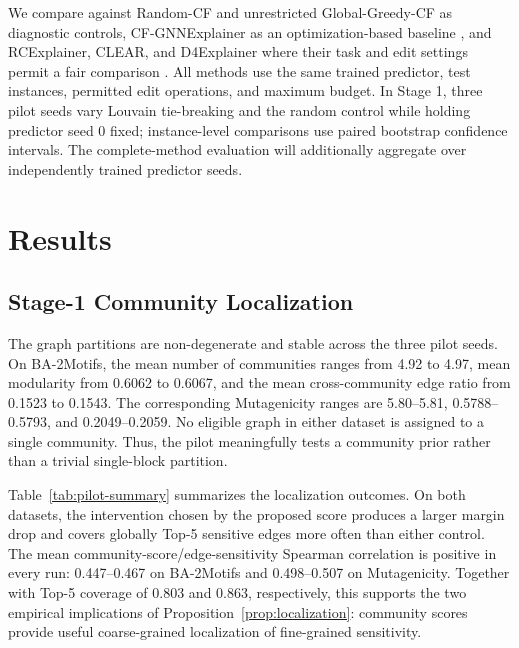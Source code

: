 \documentclass[runningheads]{llncs}
\begin{document}
We compare against Random-CF and unrestricted Global-Greedy-CF as diagnostic
controls, CF-GNNExplainer as an optimization-based baseline
\cite{lucic2022cfgnn}, and RCExplainer, CLEAR, and D4Explainer where their
task and edit settings permit a fair comparison
\cite{bajaj2021rcexplainer,ma2022clear,huang2023d4explainer}.
All methods use the same trained predictor, test instances, permitted edit
operations, and maximum budget. In Stage 1, three pilot seeds vary Louvain
tie-breaking and the random control while holding predictor seed 0 fixed;
instance-level comparisons use paired bootstrap confidence intervals. The
complete-method evaluation will additionally aggregate over independently
trained predictor seeds.

\section{Results}
\label{sec:results}

\subsection{Stage-1 Community Localization}
The graph partitions are non-degenerate and stable across the three pilot
seeds. On BA-2Motifs, the mean number of communities ranges from 4.92 to 4.97,
mean modularity from 0.6062 to 0.6067, and the mean cross-community edge ratio
from 0.1523 to 0.1543. The corresponding Mutagenicity ranges are 5.80--5.81,
0.5788--0.5793, and 0.2049--0.2059. No eligible graph in either dataset is
assigned to a single community. Thus, the pilot meaningfully tests a
community prior rather than a trivial single-block partition.

Table~\ref{tab:pilot-summary} summarizes the localization outcomes. On both
datasets, the intervention chosen by the proposed score produces a larger
margin drop and covers globally Top-5 sensitive edges more often than either
control. The mean community-score/edge-sensitivity Spearman correlation is
positive in every run: 0.447--0.467 on BA-2Motifs and 0.498--0.507 on
Mutagenicity. Together with Top-5 coverage of 0.803 and 0.863, respectively,
this supports the two empirical implications of
Proposition~\ref{prop:localization}: community scores provide useful
coarse-grained localization of fine-grained sensitivity.
\end{document}
